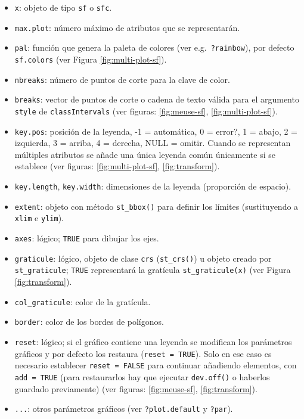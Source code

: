 \documentclass[
]{book}
\providecommand{\tightlist}{%
  \setlength{\itemsep}{0pt}\setlength{\parskip}{0pt}}
\theoremstyle{break}
\theoremstyle{definition}
\theoremstyle{definition}
\theoremstyle{definition}
\theoremstyle{definition}
\theoremstyle{remark}
\begin{document}
\begin{itemize}
\tightlist
\item
  \texttt{x}: objeto de tipo \texttt{sf} o \texttt{sfc}.
\item
  \texttt{max.plot}: número máximo de atributos que se representarán.
\item
  \texttt{pal}: función que genera la paleta de colores (ver e.g.~\texttt{?rainbow}), por defecto \texttt{sf.colors} (ver Figura \ref{fig:multi-plot-sf}).
\item
  \texttt{nbreaks}: número de puntos de corte para la clave de color.
\item
  \texttt{breaks}: vector de puntos de corte o cadena de texto válida para el argumento \texttt{style} de \texttt{classIntervals} (ver figuras: \ref{fig:meuse-sf}, \ref{fig:multi-plot-sf}).
\item
  \texttt{key.pos}: posición de la leyenda, -1 = automática, 0 = error?, 1 = abajo, 2 = izquierda, 3 = arriba, 4 = derecha, NULL = omitir. Cuando se representan múltiples atributos se añade una única leyenda común únicamente si se establece (ver figuras: \ref{fig:multi-plot-sf}, \ref{fig:transform}).
\item
  \texttt{key.length}, \texttt{key.width}: dimensiones de la leyenda (proporción de espacio).
\item
  \texttt{extent}: objeto con método \texttt{st\_bbox()} para definir los límites (sustituyendo a \texttt{xlim} e \texttt{ylim}).
\item
  \texttt{axes}: lógico; \texttt{TRUE} para dibujar los ejes.
\item
  \texttt{graticule}: lógico, objeto de clase \texttt{crs} (\texttt{st\_crs()}) u objeto creado por \texttt{st\_graticule}; \texttt{TRUE} representará la gratícula \texttt{st\_graticule(x)} (ver Figura \ref{fig:transform}).
\item
  \texttt{col\_graticule}: color de la gratícula.
\item
  \texttt{border}: color de los bordes de polígonos.
\item
  \texttt{reset}: lógico; si el gráfico contiene una leyenda se modifican los parámetros gráficos y por defecto los restaura (\texttt{reset\ =\ TRUE}). Solo en ese caso es necesario establecer \texttt{reset\ =\ FALSE} para continuar añadiendo elementos, con \texttt{add\ =\ TRUE} (para restaurarlos hay que ejecutar \texttt{dev.off()} o haberlos guardado previamente) (ver figuras: \ref{fig:meuse-sf}, \ref{fig:transform}).
\item
  \texttt{...}: otros parámetros gráficos (ver \texttt{?plot.default} y \texttt{?par}).
\end{itemize}
\end{document}
